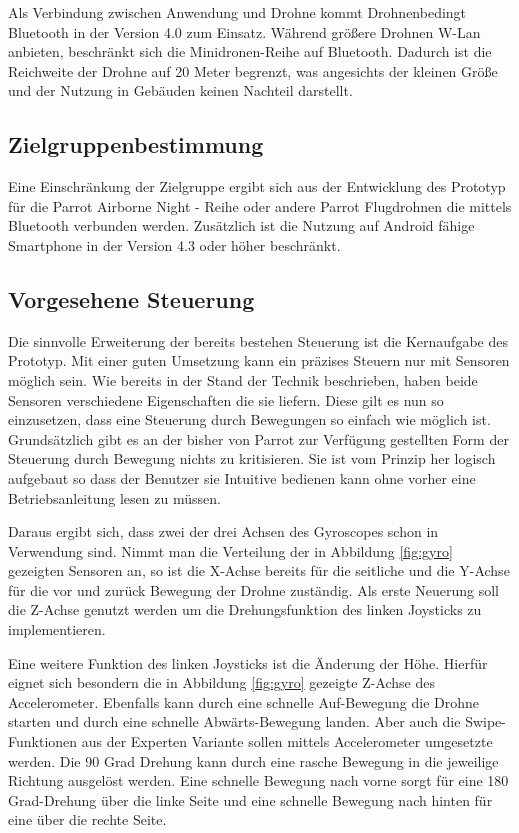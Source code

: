 \documentclass{article}
\begin{document}
Als Verbindung zwischen Anwendung und Drohne kommt Drohnenbedingt Bluetooth in der Version 4.0 zum Einsatz. Während größere Drohnen W-Lan anbieten, beschränkt sich die Minidronen-Reihe auf Bluetooth. Dadurch ist die Reichweite der Drohne auf 20 Meter begrenzt, was angesichts der kleinen Größe und der Nutzung in Gebäuden keinen Nachteil darstellt.

\subsection{Zielgruppenbestimmung}
Eine Einschränkung der Zielgruppe ergibt sich aus der Entwicklung des Prototyp für die Parrot Airborne Night - Reihe oder andere Parrot Flugdrohnen die mittels Bluetooth verbunden werden. Zusätzlich ist die Nutzung auf Android fähige Smartphone in der Version 4.3 oder höher beschränkt.
  
\subsection{Vorgesehene Steuerung}
Die sinnvolle Erweiterung der bereits bestehen Steuerung ist die Kernaufgabe des Prototyp. Mit einer guten Umsetzung kann ein präzises Steuern nur mit Sensoren möglich sein. Wie bereits in der Stand der Technik beschrieben, haben beide Sensoren verschiedene Eigenschaften die sie liefern. Diese gilt es nun so einzusetzen, dass eine Steuerung durch Bewegungen so einfach wie möglich ist. Grundsätzlich gibt es an der bisher von Parrot zur Verfügung gestellten Form der Steuerung durch Bewegung nichts zu kritisieren. Sie ist vom Prinzip her logisch aufgebaut so dass der Benutzer sie Intuitive bedienen kann ohne vorher eine Betriebsanleitung lesen zu müssen. 

Daraus ergibt sich, dass zwei der drei Achsen des Gyroscopes schon in Verwendung sind. Nimmt man die Verteilung der in Abbildung \ref{fig:gyro} gezeigten Sensoren an, so ist die X-Achse bereits für die seitliche und die Y-Achse für die vor und zurück Bewegung der Drohne zuständig. Als erste Neuerung soll die Z-Achse genutzt werden um die Drehungsfunktion des linken Joysticks zu implementieren. 

Eine weitere Funktion des linken Joysticks ist die Änderung der Höhe. Hierfür eignet sich besondern die in Abbildung \ref{fig:gyro} gezeigte Z-Achse des Accelerometer. Ebenfalls kann durch eine schnelle Auf-Bewegung die Drohne starten und durch eine schnelle Abwärts-Bewegung landen. Aber auch die Swipe-Funktionen aus der Experten Variante sollen mittels Accelerometer umgesetzte werden. Die 90 Grad Drehung kann durch eine rasche Bewegung in die jeweilige Richtung ausgelöst werden. Eine schnelle Bewegung nach vorne sorgt für eine 180 Grad-Drehung über die linke Seite und eine schnelle Bewegung nach hinten für eine über die rechte Seite. 
\end{document}
